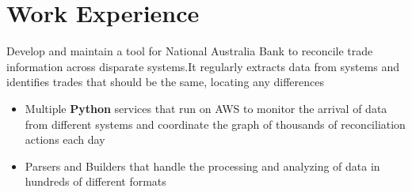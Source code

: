 \documentclass{resume}
\begin{document}
\section{Work Experience}
\begin{flushleft}
Develop and maintain a tool for National Australia Bank to reconcile trade information across disparate systems.\linebreak It regularly extracts data from systems and identifies trades that should be the same, locating any differences
\begin{itemize}
  \item Multiple \textbf{Python} services that run on AWS to monitor the arrival of data from different systems and \linebreak coordinate the graph of thousands of reconciliation actions each day
  \item Parsers and Builders that handle the processing and analyzing of data in hundreds of different formats
\end{itemize}
\end{flushleft}
\end{document}
